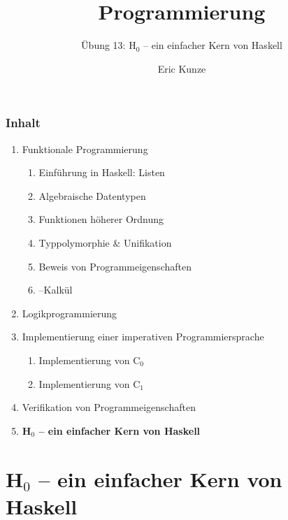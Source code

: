 \documentclass{beamer}
\begin{document}
	
	\title{Programmierung}
	\subtitle{Übung 13: H${}_{\text{0}}$ -- ein einfacher Kern von Haskell}
	\author{Eric Kunze}
	\date{}
	
	\maketitle
	


\begin{frame}[fragile] \frametitle{Inhalt}
	\begin{enumerate}
		\item Funktionale Programmierung
		\begin{enumerate}
			\item Einführung in Haskell: Listen
			\item Algebraische Datentypen
			\item Funktionen höherer Ordnung
			\item Typpolymorphie \& Unifikation
			\item Beweis von Programmeigenschaften
			\item \textlambda--Kalkül
		\end{enumerate}
		\item Logikprogrammierung
		\item Implementierung einer imperativen Programmiersprache
		\begin{enumerate}
			\item Implementierung von C${}_\text{0}$
			\item Implementierung von C${}_\text{1}$
		\end{enumerate}
		\item Verifikation von Programmeigenschaften
		\item \textbf{H${}_\text{0}$ -- ein einfacher Kern von Haskell}
	\end{enumerate}
\end{frame}


\section{H${}_\text{0}$ -- ein einfacher Kern von Haskell}
\end{document}
